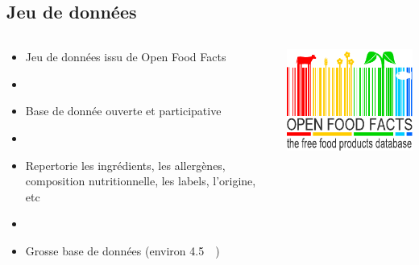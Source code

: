 \subsection{Jeu de données}
\begin{frame}{\insertsubsection}
  \begin{columns}
    \begin{column}{.6\textwidth}
      \begin{itemize}
        \item Jeu de données issu de Open Food Facts
        \item[]
        \item Base de donnée ouverte et participative
        \item[]
        \item Repertorie les ingrédients, les allergènes, composition nutritionnelle, les labels, l'origine, etc
        \item[]
        \item Grosse base de données (environ \qty{4.5}{\giga\octet})
      \end{itemize}
    \end{column}
    \begin{column}{.4\textwidth}
      \centering
      \includegraphics[width=.8\textwidth]{./openfoodfacts-logo-en.pdf}
    \end{column}
  \end{columns}
\end{frame}

